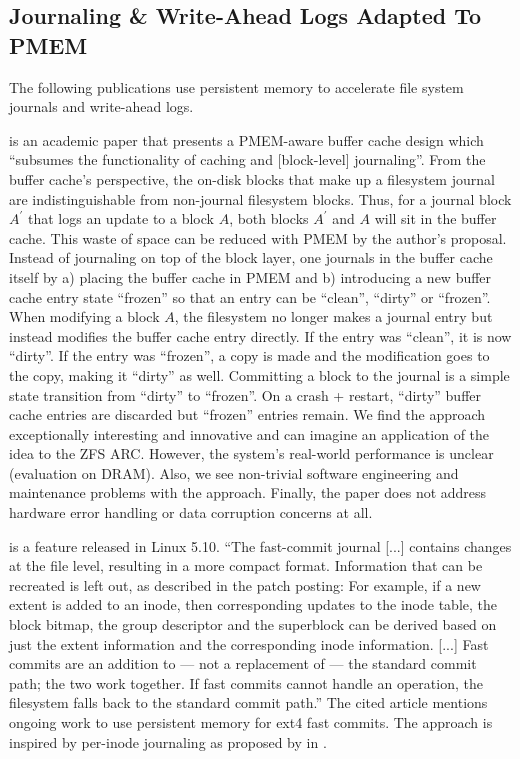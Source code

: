 \documentclass[12pt,a4paper,twoside]{book}
\begin{document}
\subsection{Journaling \& Write-Ahead Logs Adapted To PMEM}\label{sec:relwork:journalingandwals_adapted_to_pmem}
The following publications use persistent memory to accelerate file system journals and write-ahead logs.

 is an academic paper that presents a PMEM-aware buffer cache design which
“subsumes the functionality of caching and [block-level] journaling”.
From the buffer cache’s perspective, the on-disk blocks that make up a filesystem journal are indistinguishable from non-journal filesystem blocks.
Thus, for a journal block $A^\prime$ that logs an update to a block $A$, both blocks $A^\prime$ and $A$ will sit in the buffer cache.
This waste of space can be reduced with PMEM by the author’s proposal.
Instead of journaling on top of the block layer, one journals in the buffer cache itself by a) placing the buffer cache in PMEM and b) introducing a new buffer cache entry state “frozen” so that an entry can be “clean”, “dirty” or “frozen”.
When modifying a block $A$, the filesystem no longer makes a journal entry but instead modifies the buffer cache entry directly.
If the entry was “clean”, it is now “dirty”. If the entry was “frozen”, a copy is made and the modification goes to the copy, making it “dirty” as well.
Committing a block to the journal is a simple state transition from “dirty” to “frozen”. On a crash + restart, “dirty” buffer cache entries are discarded but “frozen” entries remain.
We find the approach exceptionally interesting and innovative and can imagine an application of the idea to the ZFS ARC.
However, the system’s real-world performance is unclear (evaluation on DRAM).
Also, we see non-trivial software engineering and maintenance problems with the approach.
Finally, the paper does not address hardware error handling or data corruption concerns at all.

 is a feature released in Linux 5.10.
“The fast-commit journal [...] contains changes at the file level, resulting in a more compact format.
Information that can be recreated is left out, as described in the patch posting:
For example, if a new extent is added to an inode, then  corresponding updates to the inode table, the block bitmap, the group descriptor and the superblock can be derived based on just the extent information and the corresponding inode information.
    [...] Fast commits are an addition to — not a replacement of — the standard commit path; the two work together.
If fast commits cannot handle an operation, the filesystem falls back to the standard commit path.”
The cited article mentions ongoing work to use persistent memory for ext4 fast commits.
The approach is inspired by per-inode journaling as proposed by \citeauthor{parkIJournalingFinegrainedJournaling2017} in \cite{parkIJournalingFinegrainedJournaling2017}.
\end{document}
